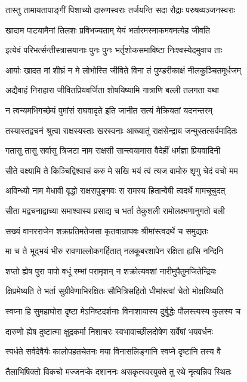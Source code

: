 \twolineshloka
{तास्तु तामायतापाङ्गीं पिशाच्यो दारुणस्वराः}
{तर्जयन्ति सदा रौद्राः परुषव्यञ्जनस्वराः}


\twolineshloka
{खादाम पाटयामैनां तिलशः प्रविभज्यताम्}
{येयं भर्तारमस्माकमवमत्येह जीवति}


\twolineshloka
{इत्येवं परिभर्त्सन्तीस्त्रासयानाः पुनः पुनः}
{भर्तृशोकसमाविष्टा निःश्वस्येदमुवाच ताः}


\twolineshloka
{आर्याः खादत मां शीघ्रं न मे लोभोस्ति जीविते}
{विना तं पुण्डरीकाक्षं नीलकुञ्चितमूर्धजम्}


\twolineshloka
{अद्यैवाहं निराहारा जीवितप्रियवर्जिता}
{शोषयिष्यामि गात्राणि बल्ली तलगता यथा}


\twolineshloka
{न त्वन्यमभिगच्छेयं पुमांसं राघवादृते}
{इति जानीत सत्यं मेक्रियतां यदनन्तरम्}


\twolineshloka
{तस्यास्तद्वचनं श्रुत्वा राक्षस्यस्ताः खरस्वनाः}
{आख्यातुं राक्षसेन्द्राय जन्मुस्तत्सर्वमादितः}


\twolineshloka
{गतासु तासु सर्वासु त्रिजटा नाम राक्षसी}
{सान्त्वयामास वैदेहीं धर्मज्ञा प्रियवादिनी}


\twolineshloka
{सीते वक्ष्यामि ते किञ्चिद्विश्वासं करु मे सखि}
{भयं त्वं त्यज वामोरु शृणु चेदं वचो मम}


\twolineshloka
{अविन्ध्यो नाम मेधावी वृद्धो राक्षसपुङ्गवः}
{स रामस्य हितान्वेषी त्वदर्थे मामचूचुदत्}


\twolineshloka
{सीता मद्वचनाद्वाच्या समाश्वास्य प्रसाद्य च}
{भर्ता तेकुशली रामोलक्ष्मणानुगतो बली}


\twolineshloka
{सख्यं वानरराजेन शक्रप्रतिमतेजसा}
{कृतवान्राघवः श्रीमांस्त्वदर्थे च समुद्यतः}


\twolineshloka
{मा च ते भूद्भयं भीरु रावणाल्लोकगर्हितात्}
{नलकूबरशापेन रक्षिता ह्यसि नन्दिनि}


\twolineshloka
{शप्तो ह्येष पुरा पापो वधूं रम्भां परामृशन्}
{न शक्रोत्यवशां नारीमुपैतुमजितेन्द्रियः}


\twolineshloka
{क्षिप्रमेष्यति ते भर्ता सुग्रीवेणाभिरक्षितः}
{सौमित्रिसहितो धीमांस्त्वां चेतो मोक्षयिष्यति}


\twolineshloka
{स्वप्ना हि सुमहाघोरा दृष्टा मेऽनिष्टदर्शनाः}
{विनाशायास्य दुर्बुद्धेः पौलस्त्यस्य कुलस्य च}


\twolineshloka
{दारुणो ह्येष दुष्टात्मा क्षुद्रकर्मा निशाचरः}
{स्वभावाच्छीलदोषेण सर्वेषां भयवर्धनः}


\twolineshloka
{स्पर्धते सर्वदेवैर्यः कालोपहतचेतनः}
{मया विनासलिङ्गानि स्वप्ने दृष्टानि तस्य वै}


\twolineshloka
{तैलाभिषिक्तो विकचो मज्जनप्के दशाननः}
{असकृत्स्वरयुक्ते तु रथे नृत्यन्निव स्थितः}


